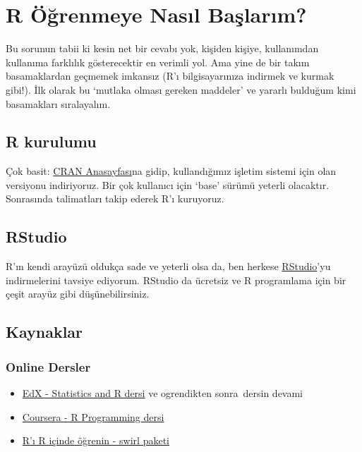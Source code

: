 \documentclass[]{book}
\providecommand{\tightlist}{%
  \setlength{\itemsep}{0pt}\setlength{\parskip}{0pt}}
\begin{document}
\hypertarget{r-ogrenmeye-nasl-baslarm}{%
\section{R Öğrenmeye Nasıl Başlarım?}\label{r-ogrenmeye-nasl-baslarm}}

Bu sorunun tabii ki kesin net bir cevabı yok, kişiden kişiye,
kullanımdan kullanıma farklılık gösterecektir en verimli yol. Ama yine
de bir takım basamaklardan geçmemek imkansız (R'ı bilgisayarınıza
indirmek ve kurmak gibi!). İlk olarak bu `mutlaka olması gereken
maddeler' ve yararlı bulduğum kimi basamakları sıralayalım.

\hypertarget{r-kurulumu}{%
\subsection{R kurulumu}\label{r-kurulumu}}

Çok basit: \href{https://cran.r-project.org}{CRAN Anasayfası}na gidip,
kullandığımız işletim sistemi için olan versiyonu indiriyoruz. Bir çok
kullanıcı için `base' sürümü yeterli olacaktır. Sonrasında talimatları
takip ederek R'ı kuruyoruz.

\hypertarget{rstudio}{%
\subsection{RStudio}\label{rstudio}}

R'ın kendi arayüzü oldukça sade ve yeterli olsa da, ben herkese
\href{https://www.rstudio.com/}{RStudio}'yu indirmelerini tavsiye
ediyorum. RStudio da ücretsiz ve R programlama için bir çeşit arayüz
gibi düşünebilirsiniz.

\hypertarget{kaynaklar}{%
\subsection{Kaynaklar}\label{kaynaklar}}

\hypertarget{online-dersler}{%
\subsubsection{Online Dersler}\label{online-dersler}}

\begin{itemize}
\tightlist
\item
  \href{https://www.edx.org/course/statistics-r-harvardx-ph525-1x-1}{EdX
  - Statistics and R dersi} ve ogrendikten sonra~dersin devami
\item
  \href{https://www.coursera.org/learn/r-programming}{Coursera - R
  Programming dersi}
\item
  \href{https://swirlstats.com/}{R'ı R içinde öğrenin - swirl paketi}
\end{itemize}
\end{document}
